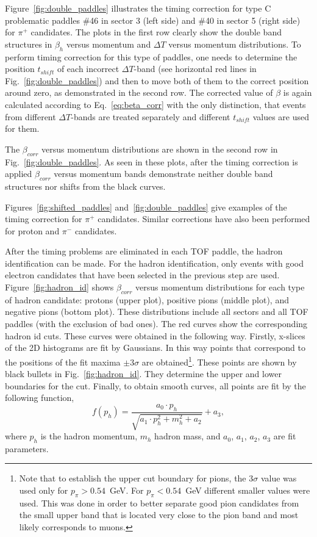 Figure~\ref{fig:double_paddles} illustrates the timing correction for type C problematic paddles \#46 in sector 3 (left side) and \#40 in sector 5 (right side) for $\pi^+$ candidates. The plots in the first row clearly show the double band structures in $\beta_{h}$ versus momentum and $\Delta T$ versus momentum distributions. To perform timing correction for this type of paddles, one needs to determine the position $t_{shift}$ of each incorrect $\Delta T$-band (see horizontal red lines in Fig.~\ref{fig:double_paddles}) and then to move both of them to the correct position around zero, as demonstrated in the second row. The corrected value of $\beta$ is again calculated according to Eq.~\eqref{eq:beta_corr} with the only distinction, that events from different $\Delta T$-bands are treated separately and different $t_{shift}$ values are used for them.

The $\beta_{corr}$ versus momentum distributions are shown in the second row in Fig.~\ref{fig:double_paddles}. As seen in these plots, after the timing correction is applied $\beta_{corr}$ versus momentum bands demonstrate neither double band structures nor shifts from the black curves.


Figures~\ref{fig:shifted_paddles} and~\ref{fig:double_paddles} give examples of the timing correction for $\pi^+$ candidates. Similar corrections have also been performed for proton and $\pi^{-}$ candidates.


After the timing problems are eliminated in each TOF paddle, the hadron identification can be made. For the hadron identification, only events with good electron candidates that have been selected in the previous step are used. Figure~\ref{fig:hadron_id} shows $\beta_{corr}$ versus momentum distributions for each type of hadron candidate: protons (upper plot), positive pions (middle plot), and negative pions (bottom plot). These distributions include all sectors and all TOF paddles (with the exclusion of bad ones). The red curves show the corresponding hadron id cuts. These curves were obtained in the following way. Firstly, x-slices of the 2D histograms are fit by Gaussians. In this way points that correspond to the positions of the fit maxima $\pm 3\sigma$ are obtained\footnote[6]{Note that to establish the upper cut boundary for pions, the $3\sigma$ value was used only for $p_{\pi}>0.54$~GeV. For $p_{\pi}<0.54$~GeV different smaller values were used. This was done in order to better separate good pion candidates from the small upper band that is located very close to the pion band and most likely corresponds to muons.}. These points are shown by black bullets in Fig.~\ref{fig:hadron_id}. They determine the upper and lower boundaries for the cut. Finally, to obtain smooth curves, all points are fit by the following function,
\begin{equation}
f(p_{h})=\frac{a_{0}\cdot p_{h}}{\sqrt{a_{1}\cdot p_{h}^{2}+m_{h}^{2}+a_{2}}}+a_{3},
\label{eq:fit_f}
\end{equation}
where $p_{h}$ is the hadron momentum, $m_{h}$ hadron mass, and $a_{0}$, $a_{1}$, $a_{2}$, $a_{3}$ are fit parameters.

